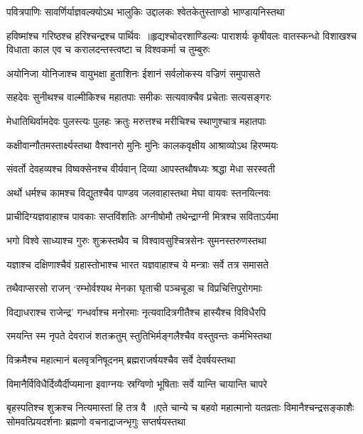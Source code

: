 \twolineshloka
{पवित्रपाणिः सावर्णिर्याज्ञवल्क्योऽथ भालुकिः}
{उद्दालकः श्वेतकेतुस्ताण्डो भाण्डायनिस्तथा}


हविष्मांश्च गरिष्ठश्च हरिश्चन्द्रश्च पार्थिवः ॥हृद्यश्चोदरशाण्डिल्यः पाराशर्यः कृषीवलः
\twolineshloka
{वातस्कन्धो विशाखश्च विधाता काल एव च}
{करालदन्तस्त्वष्टा च विश्वकर्मा च तुम्बुरुः}


\twolineshloka
{अयोनिजा योनिजाश्च वायुभक्षा हुताशिनः}
{ईशानं सर्वलोकस्य वज्रिणं समुपासते}


\twolineshloka
{सहदेवः सुनीथश्च वाल्मीकिश्च महातपाः}
{समीकः सत्यवाक्चैव प्रचेताः सत्यसङ्गरः}


\twolineshloka
{मेधातिथिर्वामदेवः पुलस्त्यः पुलहः क्रतुः}
{मरुत्तश्च मरीचिश्च स्थाणुश्चात्र महातपाः}


\twolineshloka
{कक्षीवान्गौतमस्तार्क्ष्यस्तथा वैश्वानरो मुनिः}
{मुनिः कालकवृक्षीय आश्राव्योऽथ हिरण्मयः}


\twolineshloka
{संवर्तो देवहव्यश्च विष्वक्सेनश्च वीर्यवान्}
{दिव्या आपस्तथौषध्यः श्रद्धा मेधा सरस्वती}


\twolineshloka
{अर्थो धर्मश्च कामश्च विद्युतश्चैव पाण्डव}
{जलवाहास्तथा मेघा वायवः स्तनयित्नवः}


\twolineshloka
{प्राचीदिग्यज्ञवाहाश्च पावकाः सप्तविंशतिः}
{अग्नीषोमौ तथेन्द्राग्नी मित्रश्च सविताऽर्यमा}


\twolineshloka
{भगो विश्वे साध्याश्च गुरुः शुक्रस्तथैव च}
{विश्वावसुश्चित्रसेनः सुमनस्तरुणस्तथा}


\twolineshloka
{यज्ञाश्च दक्षिणाश्चैवं ग्रहास्तोभाश्च भारत}
{यज्ञवाहाश्च ये मन्त्राः सर्वे तत्र समासते}


\twolineshloka
{तथैवाप्सरसो राजन् `रम्भोर्वश्यथ मेनका}
{घृताची पञ्चचूडा च विप्रचित्तिपुरोगमाः}


\twolineshloka
{विद्याधराश्च राजेन्द्र' गन्धर्वाश्च मनोरमाः}
{नृत्यवादित्रगीतैश्च हास्यैश्च विविधैरपि}


\twolineshloka
{रमयन्ति स्म नृपते देवराजं शतक्रतुम्}
{स्तुतिभिर्मङ्गलैश्चैव वस्तुवन्तः कर्मभिस्तथा}


\twolineshloka
{विक्रमैश्च महात्मानं बलवृत्रनिषूदनम्}
{ब्रह्मराजर्षयश्चैव सर्वे देवर्षयस्तथा}


\twolineshloka
{विमानैर्विविधैर्दिव्यैर्दीप्यमाना इवाग्नयः}
{स्रग्विणो भूषिताः सर्वे यान्ति चायान्ति चापरे}


बृहस्पतिश्च शुक्रश्च नित्यमास्तां हि तत्र वै ॥एते चान्ये च बहवो महात्मानो यतव्रताः
\twolineshloka
{विमानैश्चन्द्रसङ्काशैः सोमवत्प्रियदर्शनाः}
{ब्रह्मणो वचनाद्राजन्भृगुः सप्तर्षयस्तथा}


